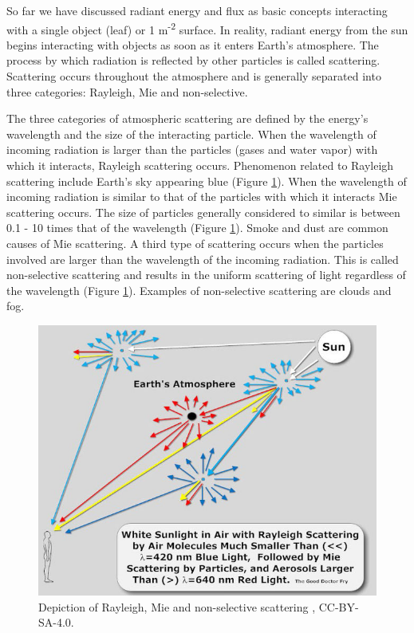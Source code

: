 \documentclass[
]{book}
\begin{document}
So far we have discussed radiant energy and flux as basic concepts interacting with a single object (leaf) or 1 m\textsuperscript{-2} surface. In reality, radiant energy from the sun begins interacting with objects as soon as it enters Earth's atmosphere. The process by which radiation is reflected by other particles is called scattering. Scattering occurs throughout the atmosphere and is generally separated into three categories: Rayleigh, Mie and non-selective.

The three categories of atmospheric scattering are defined by the energy's wavelength and the size of the interacting particle. When the wavelength of incoming radiation is larger than the particles (gases and water vapor) with which it interacts, Rayleigh scattering occurs. Phenomenon related to Rayleigh scattering include Earth's sky appearing blue (Figure \ref{fig:11-scattering}). When the wavelength of incoming radiation is similar to that of the particles with which it interacts Mie scattering occurs. The size of particles generally considered to similar is between 0.1 - 10 times that of the wavelength (Figure \ref{fig:11-scattering}). Smoke and dust are common causes of Mie scattering. A third type of scattering occurs when the particles involved are larger than the wavelength of the incoming radiation. This is called non-selective scattering and results in the uniform scattering of light regardless of the wavelength (Figure \ref{fig:11-scattering}). Examples of non-selective scattering are clouds and fog.



\begin{figure}
\includegraphics[width=0.75\linewidth]{images/11-scattering} \caption{Depiction of Rayleigh, Mie and non-selective scattering \citep{the_good_doctor_fry_diagram_2011}, CC-BY-SA-4.0.}\label{fig:11-scattering}
\end{figure}
\end{document}
